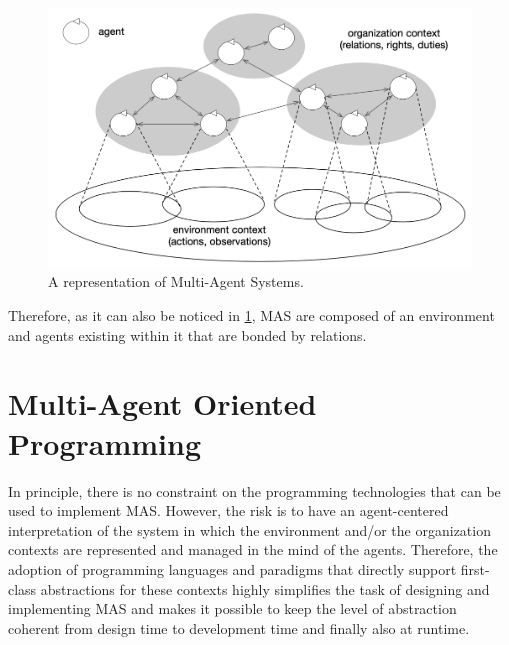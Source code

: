 \begin{figure}
    \centering
    \includegraphics[width=0.9\linewidth]{images/multi-agent-systems.png}
    \caption{A representation of Multi-Agent Systems.~\cite{jennings2000agent}}
    \label{fig:multi-agent-systems}
\end{figure}
Therefore, as it can also be noticed in \cref{fig:multi-agent-systems}, MAS are composed of an environment and agents existing within it that are bonded by relations.

\section{Multi-Agent Oriented Programming}
In principle, there is no constraint on the programming technologies that can be used to implement MAS.
However, the risk is to have an agent-centered interpretation of the system in which the environment and/or the organization contexts are represented and managed in the mind of the agents.
Therefore, the adoption of programming languages and paradigms that directly support first-class abstractions for these contexts highly simplifies the task of designing and implementing MAS and makes it possible to keep the level of abstraction coherent from design time to development time and finally also at runtime.

